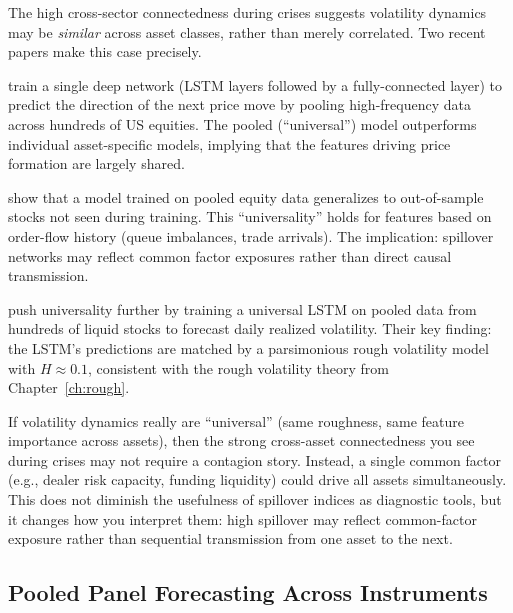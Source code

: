The high cross-sector connectedness during crises suggests volatility dynamics may be
\emph{similar} across asset classes, rather than merely correlated.  Two recent papers make
this case precisely.

\citet{SirignanoCont2019} train a single deep network (LSTM layers followed by a
fully-connected layer) to predict the direction of the next price move by pooling
high-frequency data across hundreds of US equities.
The pooled (``universal'') model outperforms individual asset-specific
models, implying that the features driving price formation are largely shared.

\begin{keyresult}
\citet{SirignanoCont2019} show that a model trained on pooled equity data generalizes
to out-of-sample stocks not seen during training.  This ``universality'' holds for
features based on order-flow history (queue imbalances, trade arrivals).  The implication:
spillover networks may reflect common factor exposures rather than direct causal
transmission.
\end{keyresult}

\citet{RosenbaumZhang2022} push universality further by training a universal LSTM
on pooled data from hundreds of liquid stocks to forecast daily realized volatility.
Their key finding: the LSTM's predictions are matched by a parsimonious rough
volatility model with $H \approx 0.1$, consistent with the rough volatility theory
from Chapter~\ref{ch:rough}.

\begin{intuition}
If volatility dynamics really are ``universal'' (same roughness, same feature
importance across assets), then the strong cross-asset connectedness you see during
crises may not require a contagion story.  Instead, a single common factor (e.g.,
dealer risk capacity, funding liquidity) could drive all assets simultaneously.
This does not diminish the usefulness of spillover indices as diagnostic tools,
but it changes how you interpret them: high spillover may reflect common-factor
exposure rather than sequential transmission from one asset to the next.
\end{intuition}

\subsection{Pooled Panel Forecasting Across Instruments}\label{sec:universality-panel}

